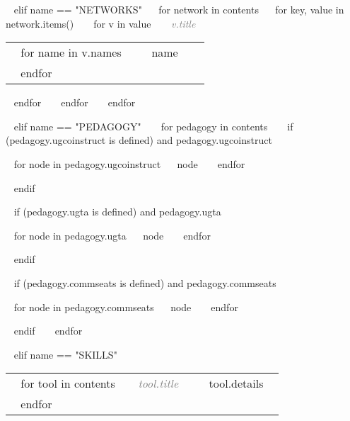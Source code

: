 \begin{minipage}{\textwidth}
~{ elif name == "NETWORKS" }~
~{for network in contents}~
  ~{ for key, value in network.items() }~
    ~{ for v in value }~
       \textcolor{gray}{{\emph{~{{ v.title }}~}}} 
       \begin{tabular}{ p{} %
                        p{} 
                        p{}} %
      ~{ for name in v.names }~ 
      \small &  ~{{ name }}~ & {\hfill}\\ 
      ~{ endfor }~
      \end{tabular}
    ~{ endfor }~
  ~{ endfor }~
~{ endfor }~ 



~{ elif name == "PEDAGOGY" }~
~{ for pedagogy in contents }~
  ~{ if (pedagogy.ugcoinstruct is defined) and pedagogy.ugcoinstruct }~
  \begin{entrylist}[.1]
    ~{ for node in pedagogy.ugcoinstruct}~
     \pedentry
      {~{{ node }}~}
    ~{ endfor }~
  \end{entrylist}
  ~{ endif }~

  ~{ if (pedagogy.ugta is defined) and pedagogy.ugta }~
  \begin{entrylist}[.1]
    ~{ for node in pedagogy.ugta}~
     \pedentry
      {~{{ node }}~}
    ~{ endfor }~
  \end{entrylist}
  ~{ endif }~

  ~{ if (pedagogy.commseats is defined) and pedagogy.commseats }~
  \begin{entrylist}[.1]
    ~{ for node in pedagogy.commseats}~
     \pedentry
      {~{{ node }}~}
    ~{ endfor }~
  \end{entrylist}
  ~{ endif }~
~{ endfor }~



~{ elif name == "SKILLS" }~

\begin{tabular}{ @{} p{32mm} p{135mm} @{} }
  ~{ for tool in contents }~
  \small \textcolor{gray}{{\emph{~{{ tool.title }}~}}} & {\small ~{{ tool.details }}~} \\
  ~{ endfor }~
\end{tabular}


\end{minipage}
